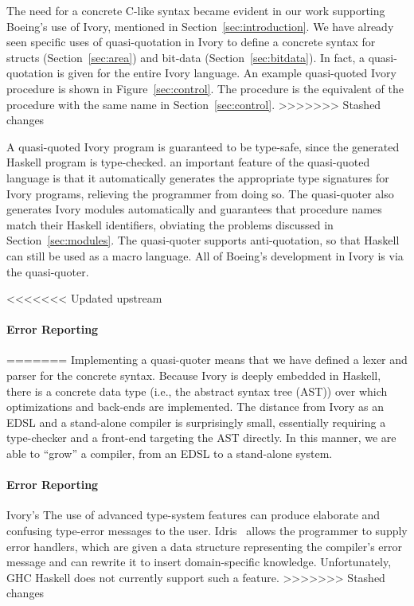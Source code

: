 The need for a concrete C-like syntax became evident in our work supporting
Boeing's use of Ivory, mentioned in Section~\ref{sec:introduction}. We have
already seen specific uses of quasi-quotation in Ivory to define a concrete
syntax for structs (Section~\ref{sec:area}) and bit-data
(Section~\ref{sec:bitdata}). In fact, a quasi-quotation is given for the entire
Ivory language. An example quasi-quoted Ivory procedure is shown in
Figure~\ref{sec:control}. The procedure is the equivalent of the procedure with
the same name in Section~\ref{sec:control}.
>>>>>>> Stashed changes

A quasi-quoted Ivory program is guaranteed to be type-safe, since the generated
Haskell program is type-checked. an important feature of the quasi-quoted
language is that it automatically generates the appropriate type signatures for
Ivory programs, relieving the programmer from doing so. The quasi-quoter also
generates Ivory modules automatically and guarantees that procedure names match
their Haskell identifiers, obviating the problems discussed in
Section~\ref{sec:modules}. The quasi-quoter supports anti-quotation, so that
Haskell can still be used as a macro language. All of Boeing's development in
Ivory is via the quasi-quoter.

<<<<<<< Updated upstream

\paragraph{Error Reporting}
=======
Implementing a quasi-quoter means that we have defined a lexer and parser for
the concrete syntax. Because Ivory is deeply embedded in Haskell, there is a
concrete data type (i.e., the abstract syntax tree (AST)) over which
optimizations and back-ends are implemented. The distance from Ivory as an EDSL
and a stand-alone compiler is surprisingly small, essentially requiring a
type-checker and a front-end targeting the AST directly. In this manner, we are
able to ``grow'' a compiler, from an EDSL to a stand-alone system.

\paragraph{Error Reporting}
Ivory's The use of advanced type-system features can produce elaborate and
confusing type-error messages to the user. Idris~\cite{christiansen2014reflect}
allows the programmer to supply error handlers, which are given a data structure
representing the compiler's error message and can rewrite it to insert
domain-specific knowledge. Unfortunately, GHC Haskell does not currently support
such a feature.
>>>>>>> Stashed changes

